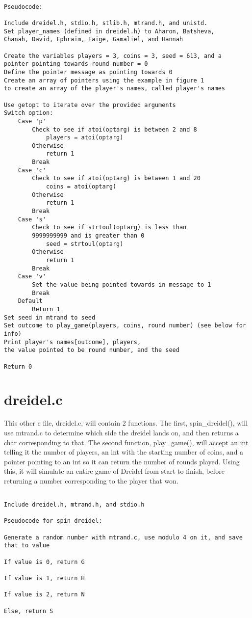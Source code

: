 \documentclass[11pt]{article}
\begin{document}
 \begin{verbatim}

Pseudocode:

Include dreidel.h, stdio.h, stlib.h, mtrand.h, and unistd.
Set player_names (defined in dreidel.h) to Aharon, Batsheva, 
Chanah, David, Ephraim, Faige, Gamaliel, and Hannah

Create the variables players = 3, coins = 3, seed = 613, and a
pointer pointing towards round number = 0
Define the pointer message as pointing towards 0
Create an array of pointers using the example in figure 1
to create an array of the player's names, called player's names

Use getopt to iterate over the provided arguments
Switch option:
    Case 'p'
        Check to see if atoi(optarg) is between 2 and 8
            players = atoi(optarg)
        Otherwise
            return 1    
        Break
    Case 'c'
        Check to see if atoi(optarg) is between 1 and 20
            coins = atoi(optarg)
        Otherwise
            return 1
        Break
    Case 's'
        Check to see if strtoul(optarg) is less than 
        9999999999 and is greater than 0
            seed = strtoul(optarg)
        Otherwise
            return 1
        Break
    Case 'v'
        Set the value being pointed towards in message to 1
        Break
    Default
        Return 1
Set seed in mtrand to seed
Set outcome to play_game(players, coins, round number) (see below for info)
Print player's names[outcome], players,
the value pointed to be round number, and the seed

Return 0

 \end{verbatim}

 \section{dreidel.c}

 This other c file, dreidel.c, will contain 2 functions. The first, spin\_dreidel(), will use mtrand.c to determine which side the dreidel lands on, and then returns a char corresponding to that. The second function, play\_game(), will accept an int telling it the number of players, an int with the starting number of coins, and a pointer pointing to an int so it can return the number of rounds played. Using this, it will simulate an entire game of Dreidel from start to finish, before returning a number corresponding to the player that won.

 \begin{verbatim}

Include dreidel.h, mtrand.h, and stdio.h

Pseudocode for spin_dreidel:

Generate a random number with mtrand.c, use modulo 4 on it, and save that to value

If value is 0, return G

If value is 1, return H

If value is 2, return N

Else, return S

 \end{verbatim}
\end{document}
